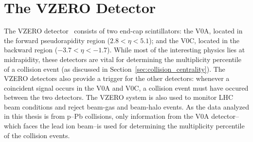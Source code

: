 
\section{The VZERO Detector}

The VZERO detector~\cite{VZERO} consists of two end-cap scintillators: the V0A, located in the forward pseudorapidity region ($2.8 < \eta < 5.1$); and the V0C, located in the backward region ($-3.7 < \eta < -1.7$). While most of the interesting physics lies at midrapidity, these detectors are vital for determining the multiplicity percentile of a collision event (as discussed in Section~\ref{sec:collision_centrality}). The VZERO detectors also provide a trigger for the other detectors: whenever a coincident signal occurs in the V0A and V0C, a collision event must have occured between the two detectors. The VZERO system is also used to monitor LHC beam conditions and reject beam-gas and beam-halo events. As the data analyzed in this thesis is from p--Pb collisions, only information from the V0A detector--which faces the lead ion beam--is used for determining the multiplicity percentile of the collision events.